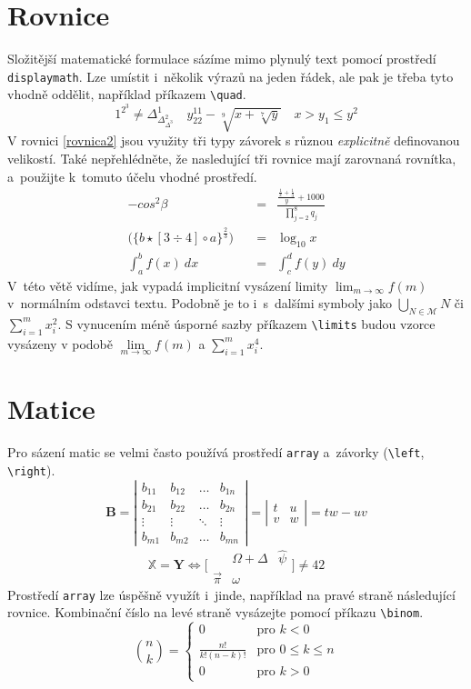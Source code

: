 \documentclass[a4paper, twocolumn, 11pt]{article}
\begin{document}
\section{Rovnice}
Složitější matematické formulace sázíme mimo plynulý text pomocí prostředí \texttt{displaymath}. Lze umístit i~několik výrazů na jeden řádek, ale pak je třeba tyto vhodně oddělit, například příkazem \verb|\quad|. 
$$
1^{2^3} \neq \Delta_{\Delta_{\Delta^3}^2}^1 \quad y_{22}^{11}-\sqrt[9]{x+\sqrt[7]{y}} \quad x>y_1\leq y^2 
$$
V rovnici \eqref{rovnica2} jsou využity tři typy závorek s různou \emph{explicitně} definovanou velikostí. Také nepřehlédněte, že nasledující tři rovnice mají zarovnaná rovnítka, a~použijte k~tomuto účelu vhodné prostředí. 
\begin{eqnarray}
-cos^2\beta &=& \frac{\frac{\frac{1}{x}+\frac{1}{3}}{y}+1000}{\prod\limits_{j=2}^{8}q_j}\label{rovnica1}\\
\bigg(\Big \{ b \star [ 3 \div 4 ]\circ a \Big \}^\frac{2}{3} \bigg) \quad &=& \log_{10} x \label{rovnica2}\\
\int_{a}^b f(x)\ dx &=& \int_{c}^d f(y)\ dy \label{rovnica3}
\end{eqnarray}
V~této větě vidíme, jak vypadá implicitní vysázení limity $\lim_{m\rightarrow\infty}f(m)$ v~normálním odstavci textu. Podobně je to i~s~dalšími symboly jako $\bigcup_{N\in \mathcal{M}} N$ či $\sum_{i=1}^m x_{i}^2$. S vynucením méně úsporné sazby příkazem \verb|\limits| budou vzorce vysázeny v podobě $\lim\limits_{m\rightarrow\infty}f(m)$ a $\sum\limits_{i=1}^m x_{i}^4$.

\section{Matice}
Pro sázení matic se velmi často používá prostředí \texttt{array} a~závorky (\verb|\left|, \verb|\right|). 
$$
\mathbf{B}=\left|\begin{array}{cccc}
b_{11} & b_{12} & \dots & b_{1 n} \\
b_{21} & b_{22} & \dots & b_{2 n} \\
\vdots & \vdots & \ddots & \vdots \\
b_{m 1} & b_{m 2} & \dots & b_{m n}
\end{array}\right|=\left|\begin{array}{cc}
t & u \\
v & w
\end{array}\right|=t w-u v
$$
$$
\mathbb X = \mathbf {Y} \Longleftrightarrow \bigg [ \begin{array}{ccc}
     & \Omega +\Delta & \hat{\psi}  \\
  \vec{\pi}   &  \omega
\end{array}\bigg ] \neq 42
$$
Prostředí \texttt{array} lze úspěšně využít i~jinde, například na pravé straně následující rovnice. Kombinační číslo na levé straně vysázejte pomocí příkazu \verb|\binom|.
$$
\binom{n}{k}=\left\{\begin{array}{cl}
0 & \text {pro } k < 0 \\
\frac{n !}{k !(n-k) !} & \text {pro } 0 \leq k \leq n \\
0 & \text {pro } k>0 
\end{array}\right.
$$
\end{document}
